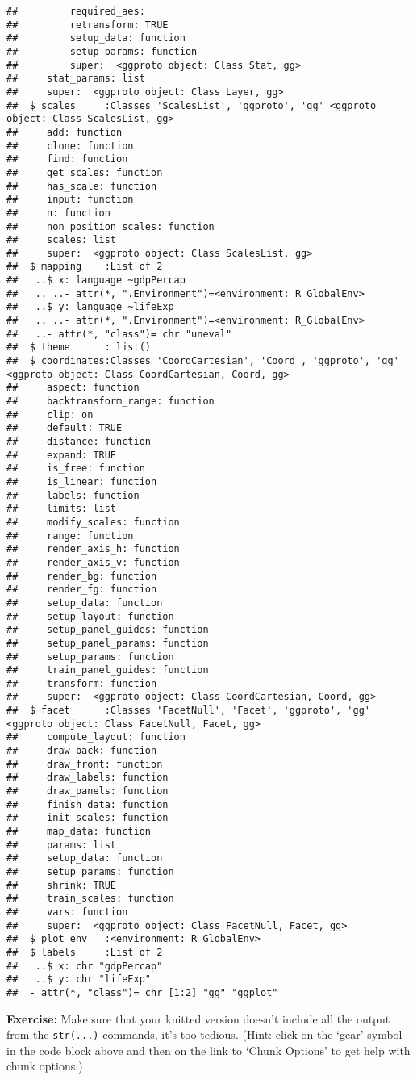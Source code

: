 \documentclass[
]{article}
\begin{document}
\begin{verbatim}
##         required_aes: 
##         retransform: TRUE
##         setup_data: function
##         setup_params: function
##         super:  <ggproto object: Class Stat, gg>
##     stat_params: list
##     super:  <ggproto object: Class Layer, gg> 
##  $ scales     :Classes 'ScalesList', 'ggproto', 'gg' <ggproto object: Class ScalesList, gg>
##     add: function
##     clone: function
##     find: function
##     get_scales: function
##     has_scale: function
##     input: function
##     n: function
##     non_position_scales: function
##     scales: list
##     super:  <ggproto object: Class ScalesList, gg> 
##  $ mapping    :List of 2
##   ..$ x: language ~gdpPercap
##   .. ..- attr(*, ".Environment")=<environment: R_GlobalEnv> 
##   ..$ y: language ~lifeExp
##   .. ..- attr(*, ".Environment")=<environment: R_GlobalEnv> 
##   ..- attr(*, "class")= chr "uneval"
##  $ theme      : list()
##  $ coordinates:Classes 'CoordCartesian', 'Coord', 'ggproto', 'gg' <ggproto object: Class CoordCartesian, Coord, gg>
##     aspect: function
##     backtransform_range: function
##     clip: on
##     default: TRUE
##     distance: function
##     expand: TRUE
##     is_free: function
##     is_linear: function
##     labels: function
##     limits: list
##     modify_scales: function
##     range: function
##     render_axis_h: function
##     render_axis_v: function
##     render_bg: function
##     render_fg: function
##     setup_data: function
##     setup_layout: function
##     setup_panel_guides: function
##     setup_panel_params: function
##     setup_params: function
##     train_panel_guides: function
##     transform: function
##     super:  <ggproto object: Class CoordCartesian, Coord, gg> 
##  $ facet      :Classes 'FacetNull', 'Facet', 'ggproto', 'gg' <ggproto object: Class FacetNull, Facet, gg>
##     compute_layout: function
##     draw_back: function
##     draw_front: function
##     draw_labels: function
##     draw_panels: function
##     finish_data: function
##     init_scales: function
##     map_data: function
##     params: list
##     setup_data: function
##     setup_params: function
##     shrink: TRUE
##     train_scales: function
##     vars: function
##     super:  <ggproto object: Class FacetNull, Facet, gg> 
##  $ plot_env   :<environment: R_GlobalEnv> 
##  $ labels     :List of 2
##   ..$ x: chr "gdpPercap"
##   ..$ y: chr "lifeExp"
##  - attr(*, "class")= chr [1:2] "gg" "ggplot"
\end{verbatim}

\textbf{Exercise:} Make sure that your knitted version doesn't include
all the output from the \texttt{str(...)} commands, it's too tedious.
(Hint: click on the `gear' symbol in the code block above and then on
the link to `Chunk Options' to get help with chunk options.)
\end{document}
